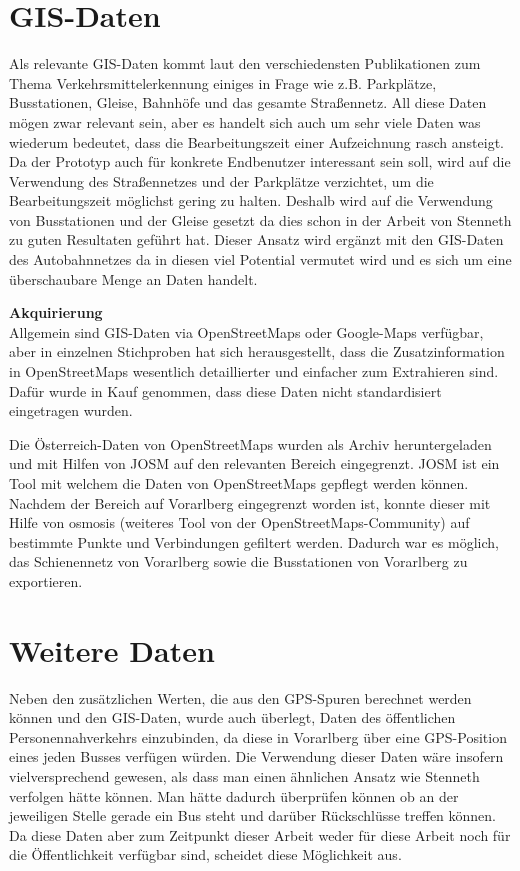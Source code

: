 \section{GIS-Daten}
Als relevante GIS-Daten kommt laut den verschiedensten Publikationen zum Thema Verkehrsmittelerkennung einiges in Frage wie z.B. Parkplätze, Busstationen, Gleise, Bahnhöfe und das gesamte Straßennetz. All diese Daten mögen zwar relevant sein, aber es handelt sich auch um sehr viele Daten was wiederum bedeutet, dass die Bearbeitungszeit einer Aufzeichnung rasch ansteigt. Da der Prototyp auch für konkrete Endbenutzer interessant sein soll, wird auf die Verwendung des Straßennetzes und der Parkplätze verzichtet, um die Bearbeitungszeit möglichst gering zu halten. Deshalb wird auf die Verwendung von Busstationen und der Gleise gesetzt da dies schon in der Arbeit von Stenneth \cite{stenneth_transportation_2011} zu guten Resultaten geführt hat. Dieser Ansatz wird ergänzt mit den GIS-Daten des Autobahnnetzes da in diesen viel Potential vermutet wird und es sich um eine überschaubare Menge an Daten handelt.

\textbf{Akquirierung}\\
Allgemein sind GIS-Daten via OpenStreetMaps oder Google-Maps verfügbar, aber in einzelnen Stichproben hat sich herausgestellt, dass die Zusatzinformation in OpenStreetMaps wesentlich detaillierter und einfacher zum Extrahieren sind. Dafür wurde in Kauf genommen, dass diese Daten nicht standardisiert eingetragen wurden.

Die Österreich-Daten von OpenStreetMaps wurden als Archiv heruntergeladen und mit Hilfen von JOSM auf den relevanten Bereich eingegrenzt. JOSM ist ein Tool mit welchem die Daten von OpenStreetMaps gepflegt werden können. Nachdem der Bereich auf Vorarlberg eingegrenzt worden ist, konnte dieser mit Hilfe von osmosis (weiteres Tool von der OpenStreetMaps-Community) auf bestimmte Punkte und Verbindungen gefiltert werden. Dadurch war es möglich, das Schienennetz von Vorarlberg sowie die Busstationen von Vorarlberg zu exportieren.


\section{Weitere Daten}
Neben den zusätzlichen Werten, die aus den GPS-Spuren berechnet werden können und den GIS-Daten, wurde auch überlegt, Daten des öffentlichen Personennahverkehrs einzubinden, da diese in Vorarlberg über eine GPS-Position eines jeden Busses verfügen würden. Die Verwendung dieser Daten wäre insofern vielversprechend gewesen, als dass man einen ähnlichen Ansatz wie Stenneth verfolgen hätte können. Man hätte dadurch überprüfen können ob an der jeweiligen Stelle gerade ein Bus steht und darüber Rückschlüsse treffen können. Da diese Daten aber zum Zeitpunkt dieser Arbeit weder für diese Arbeit noch für die Öffentlichkeit verfügbar sind, scheidet diese Möglichkeit aus.


